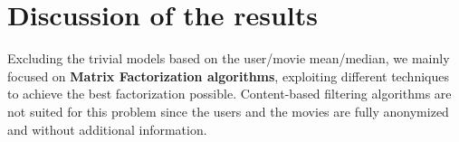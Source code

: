 \documentclass[10pt,conference,compsocconf]{IEEEtran}
\makeatletter
\newcommand{\specialcell}[2][c]{%
  \begin{tabular}[#1]{@{}l@{}}#2\end{tabular}}
\makeatother
\begin{document}
%
\section{Discussion of the results}

Excluding the trivial models based on the user/movie mean/median, we mainly focused on \textbf{Matrix
Factorization algorithms}, exploiting different techniques to achieve the best factorization
possible. Content-based filtering algorithms are not suited for this problem since the users and the
movies are fully anonymized and without additional information.
\end{document}
